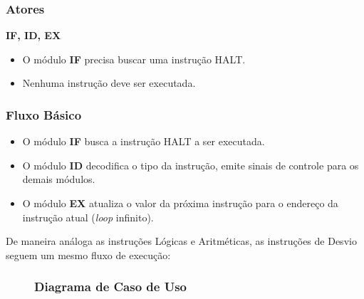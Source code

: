 \subsubsection*{Atores}
\textbf{IF, ID, EX}

\preconditions 
\begin{itemize}
	\item O módulo \textbf{IF} precisa buscar uma instrução HALT.
\end{itemize}

\postconditions
\begin{itemize}
	\item Nenhuma instrução deve ser executada.
\end{itemize}

\subsubsection*{Fluxo Básico}
\begin{itemize}
	\item O módulo \textbf{IF} busca a instrução HALT a ser executada.
	\item O módulo \textbf{ID} decodifica o tipo da instrução, emite sinais de controle para os demais módulos.
	\item O módulo \textbf{EX} atualiza o valor da próxima instrução para o endereço da instrução atual (\textit{loop} infinito).
\end{itemize}

De maneira análoga as instruções Lógicas e Aritméticas, as instruções de Desvio seguem um mesmo fluxo de execução:

\begin{figure}[H]
	\subsubsection*{Diagrama de Caso de Uso}
	
\end{figure}
